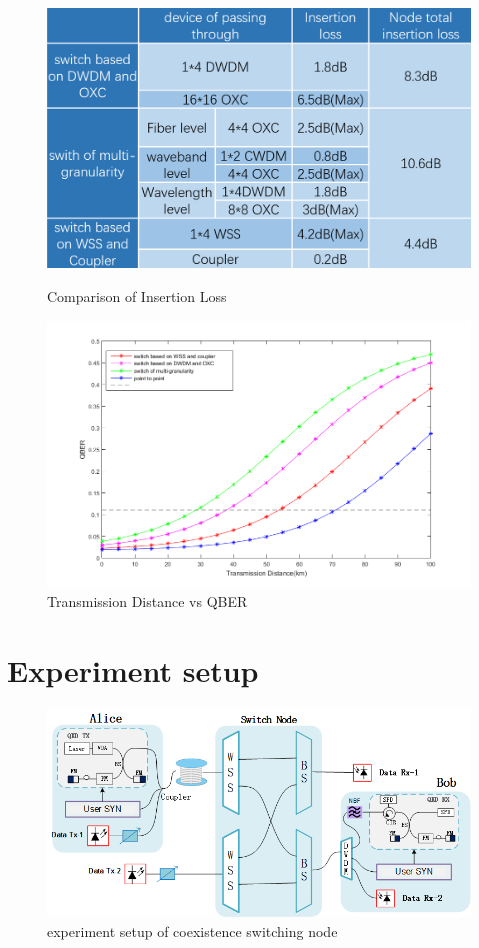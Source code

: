 \documentclass[letterpaper,10pt]{article}
\begin{document}
\begin{figure}[!htb]
   \begin{minipage}{0.48\textwidth}
     \centering
     \includegraphics[width=.9\linewidth]{comparison_of_three_kind_of_nodes}
     \caption{Comparison of Insertion Loss} \label{Fig:comparison_of_loss}
   \end{minipage}\hfill
   \begin{minipage}{0.48\textwidth}
     \centering
     \includegraphics[width=.9\linewidth]{transmission_distance_vs_QBER_of_three_nodes_2}
     \caption{Transmission Distance vs QBER} \label{Fig:comparison_of_rate}
   \end{minipage}
\end{figure}

\section{Experiment setup}

\begin{figure}
 \centering
 \includegraphics[width=.8\linewidth]{experiment_of_switching_node}
 \caption{experiment setup of coexistence switching node}
\end{figure}
\end{document}
